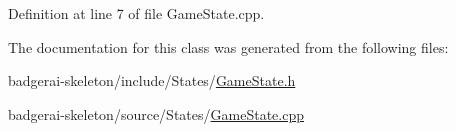 Definition at line 7 of file Game\-State.\-cpp.


\begin{DoxyCode}
{
}
\end{DoxyCode}


The documentation for this class was generated from the following files\-:\begin{DoxyCompactItemize}
\item 
badgerai-\/skeleton/include/\-States/\hyperlink{GameState_8h}{Game\-State.\-h}\item 
badgerai-\/skeleton/source/\-States/\hyperlink{GameState_8cpp}{Game\-State.\-cpp}\end{DoxyCompactItemize}
